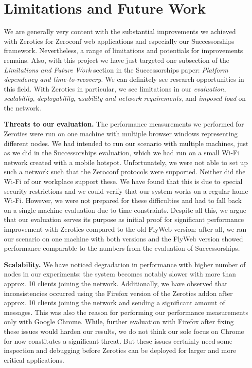 \section{Limitations and Future Work}
\label{sec:limitations_and_future_work}

We are generally very content with the substantial improvements we achieved with Zeroties for Zeroconf web applications and especially our Successorships framework.
Nevertheless, a range of limitations and potentials for improvements remains.
Also, with this project we have just targeted one subsection of the \textit{Limitations and Future Work} section in the Successorships paper: \textit{Platform dependency and time-to-recovery.}
We can definitely see research opportunities in this field.
With Zeroties in particular, we see limitations in our \textit{evaluation}, \textit{scalability}, \textit{deployability}, \textit{usability and network requirements}, and \textit{imposed load} on the network.

\textbf{Threats to our evaluation.}
The performance measurements we performed for Zeroties were run on one machine with multiple browser windows representing different nodes.
We had intended to run our scenario with multiple machines, just as we did in the Successorships evaluation, which we had run on a small Wi-Fi network created with a mobile hotspot.
Unfortunately, we were not able to set up such a network such that the Zeroconf protocols were supported.
Neither did the Wi-Fi of our workplace support these.
We have found that this is due to special security restrictions and we could verify that our system works on a regular home Wi-Fi.
However, we were not prepared for these difficulties and had to fall back on a single-machine evaluation due to time constraints.
Despite all this, we argue that our evaluation serves its purpose as initial proof for significant performance improvement with Zeroties compared to the old FlyWeb version: after all, we ran our scenario on one machine with both versions and the FlyWeb version showed performance comparable to the numbers from the evaluation of Successorships.

\textbf{Scalability.}
We have noticed degradation in performance with higher number of nodes in our experiments: the system becomes notably slower with more than approx. 10 clients joining the network.
Additionally, we have observed that inconsistencies occurred using the Firefox version of the Zeroties addon after approx. 10 clients joining the network and sending a significant amount of messages.
This was also the reason for performing our performance measurements only with Google Chrome.
While, further evaluation with Firefox after fixing these issues would harden our results, we do not think our sole focus on Chrome for now constitutes a significant threat.
But these issues certainly need some inspection and debugging before Zeroties can be deployed for larger and more critical applications.

